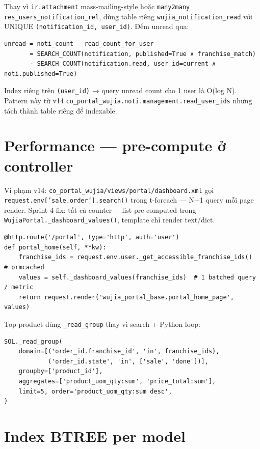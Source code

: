 Thay vì \texttt{ir.attachment} mass-mailing-style hoặc \texttt{many2many res\_users\_notification\_rel}, dùng table riêng \texttt{wujia\_notification\_read} với UNIQUE \texttt{(notification\_id, user\_id)}. Đếm unread qua:

\begin{lstlisting}[style=python]
unread = noti_count - read_count_for_user
       = SEARCH_COUNT(notification, published=True ∧ franchise_match)
       - SEARCH_COUNT(notification.read, user_id=current ∧ noti.published=True)
\end{lstlisting}

Index riêng trên \texttt{(user\_id)} → query unread count cho 1 user là O(log N). Pattern này từ v14 \texttt{co\_portal\_wujia.noti.management.read\_user\_ids} nhưng tách thành table riêng để indexable.

\section{Performance — pre-compute ở controller}

Vi phạm v14: \texttt{co\_portal\_wujia/views/portal/dashboard.xml} gọi \texttt{request.env['sale.order'].search()} trong t-foreach — N+1 query mỗi page render. Sprint 4 fix: tất cả counter + list pre-computed trong \texttt{WujiaPortal.\_dashboard\_values()}, template chỉ render text/dict.

\begin{lstlisting}[style=python]
@http.route('/portal', type='http', auth='user')
def portal_home(self, **kw):
    franchise_ids = request.env.user._get_accessible_franchise_ids()  # ormcached
    values = self._dashboard_values(franchise_ids)  # 1 batched query / metric
    return request.render('wujia_portal_base.portal_home_page', values)
\end{lstlisting}

Top product dùng \texttt{\_read\_group} thay vì search + Python loop:

\begin{lstlisting}[style=python]
SOL._read_group(
    domain=[('order_id.franchise_id', 'in', franchise_ids),
            ('order_id.state', 'in', ['sale', 'done'])],
    groupby=['product_id'],
    aggregates=['product_uom_qty:sum', 'price_total:sum'],
    limit=5, order='product_uom_qty:sum desc',
)
\end{lstlisting}

\section{Index BTREE per model}

